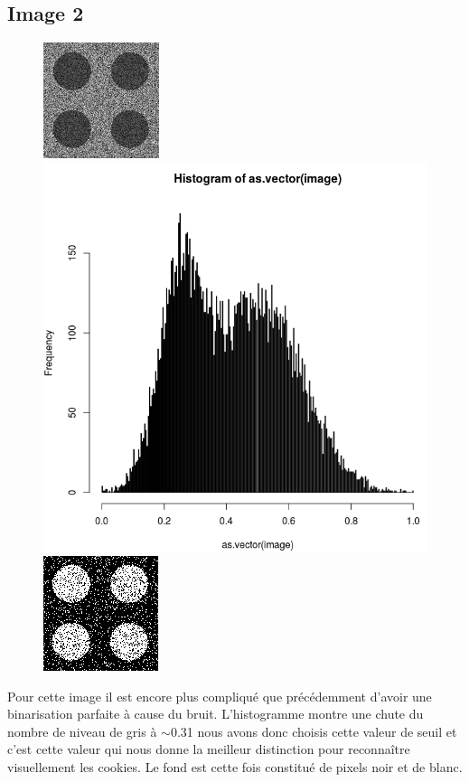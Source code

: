 \documentclass[a4paper,12pt]{report}
\begin{document}
\newpage

\subsection*{Image 2}
\begin{figure}[!ht]
	\center
	\includegraphics[scale=0.5]{../rdf-2-classes-texture-2.png}
	\includegraphics[scale=0.3]{image/text2.png}
	\includegraphics[scale=0.5]{image/text21.png}
\end{figure}

Pour cette image il est encore plus compliqué que précédemment d'avoir une binarisation parfaite à cause du bruit. L'histogramme montre une chute du nombre de niveau de gris à $\sim$0.31 nous avons donc choisis cette valeur de seuil et c'est cette valeur qui nous donne la meilleur distinction pour reconnaître visuellement les cookies. Le fond est cette fois constitué de pixels noir et de blanc.
\end{document}
